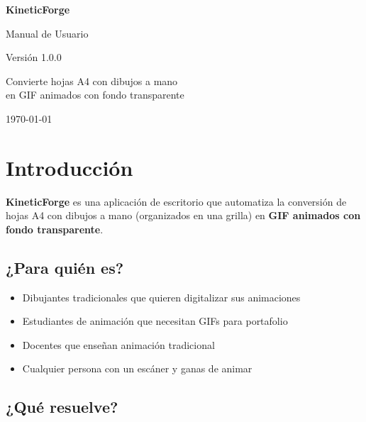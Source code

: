 \documentclass[12pt,a4paper]{article}
\begin{document}
\begin{titlepage}
    \centering
    \vspace*{3cm}

    {\Huge\bfseries KineticForge\par}
    \vspace{0.5cm}
    {\Large Manual de Usuario\par}
    \vspace{0.3cm}
    {\large Versión 1.0.0\par}

    \vspace{3cm}

    {\large Convierte hojas A4 con dibujos a mano\\en GIF animados con fondo transparente\par}

    \vfill

    {\large \today\par}
\end{titlepage}

\tableofcontents
\newpage

\section{Introducción}

\textbf{KineticForge} es una aplicación de escritorio que automatiza la conversión de
hojas A4 con dibujos a mano (organizados en una grilla) en \textbf{GIF animados con
fondo transparente}.

\subsection{¿Para quién es?}

\begin{itemize}[leftmargin=*]
    \item Dibujantes tradicionales que quieren digitalizar sus animaciones
    \item Estudiantes de animación que necesitan GIFs para portafolio
    \item Docentes que enseñan animación tradicional
    \item Cualquier persona con un escáner y ganas de animar
\end{itemize}

\subsection{¿Qué resuelve?}
\end{document}
